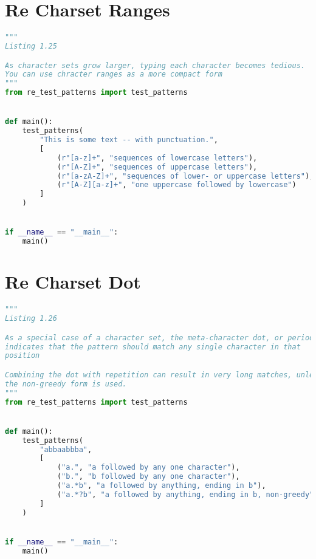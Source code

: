 \documentclass[a4paper,landscape]{report}
\begin{document}
\section{Re Charset Ranges}
\begin{lstlisting}[language=Python]
"""
Listing 1.25

As character sets grow larger, typing each character becomes tedious.
You can use chracter ranges as a more compact form
"""
from re_test_patterns import test_patterns


def main():
    test_patterns(
        "This is some text -- with punctuation.",
        [
            (r"[a-z]+", "sequences of lowercase letters"),
            (r"[A-Z]+", "sequences of uppercase letters"),
            (r"[a-zA-Z]+", "sequences of lower- or uppercase letters"),
            (r"[A-Z][a-z]+", "one uppercase followed by lowercase")
        ]
    )


if __name__ == "__main__":
    main()

\end{lstlisting}
\section{Re Charset Dot}
\begin{lstlisting}[language=Python]
"""
Listing 1.26

As a special case of a character set, the meta-character dot, or period
indicates that the pattern should match any single character in that
position

Combining the dot with repetition can result in very long matches, unless
the non-greedy form is used.
"""
from re_test_patterns import test_patterns


def main():
    test_patterns(
        "abbaabbba",
        [
            ("a.", "a followed by any one character"),
            ("b.", "b followed by any one character"),
            ("a.*b", "a followed by anything, ending in b"),
            ("a.*?b", "a followed by anything, ending in b, non-greedy")
        ]
    )


if __name__ == "__main__":
    main()

\end{lstlisting}
\end{document}
